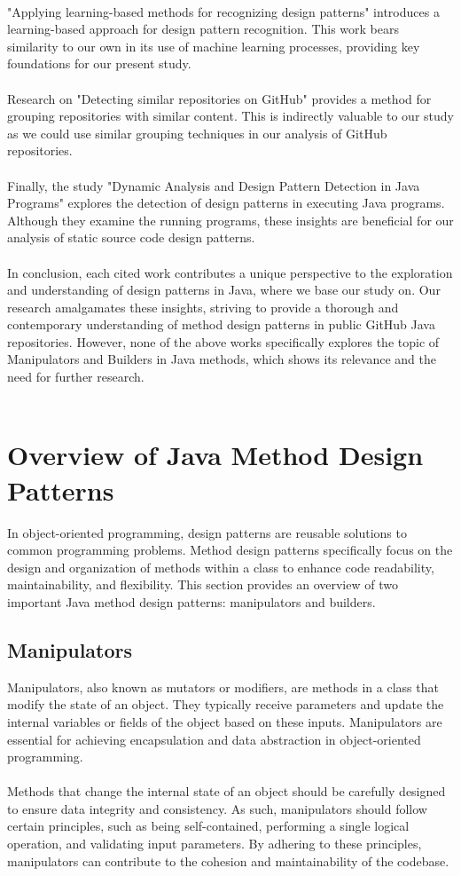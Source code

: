 \documentclass[draft]{article}
\begin{document}
~\\
"{}Applying learning-based methods for recognizing design patterns"{} \cite{ref6} introduces a learning-based approach for design pattern recognition. This work bears similarity to our own in its use of machine learning processes, providing key foundations for our present study.\\
~\\
Research on "{}Detecting similar repositories on GitHub"{} \cite{ref7} provides a method for grouping repositories with similar content. This is indirectly valuable to our study as we could use similar grouping techniques in our analysis of GitHub repositories.\\
~\\
Finally, the study "{}Dynamic Analysis and Design Pattern Detection in Java Programs"{} \cite{ref8} explores the detection of design patterns in executing Java programs. Although they examine the running programs, these insights are beneficial for our analysis of static source code design patterns.\\
~\\
In conclusion, each cited work contributes a unique perspective to the exploration and understanding of design patterns in Java, where we base our study on. Our research amalgamates these insights, striving to provide a thorough and contemporary understanding of method design patterns in public GitHub Java repositories. However, none of the above works specifically explores the topic of Manipulators and Builders in Java methods, which shows its relevance and the need for further research.\\


~\\

\newpage
\section{Overview of Java Method Design Patterns}
In object-oriented programming, design patterns are reusable solutions to common programming problems. Method design patterns specifically focus on the design and organization of methods within a class to enhance code readability, maintainability, and flexibility. This section provides an overview of two important Java method design patterns: manipulators and builders.
\subsection{Manipulators}
Manipulators, also known as mutators or modifiers, are methods in a class that modify the state of an object. They typically receive parameters and update the internal variables or fields of the object based on these inputs. Manipulators are essential for achieving encapsulation and data abstraction in object-oriented programming.\\
~\\
Methods that change the internal state of an object should be carefully designed to ensure data integrity and consistency. As such, manipulators should follow certain principles, such as being self-contained, performing a single logical operation, and validating input parameters. By adhering to these principles, manipulators can contribute to the cohesion and maintainability of the codebase.
\end{document}
